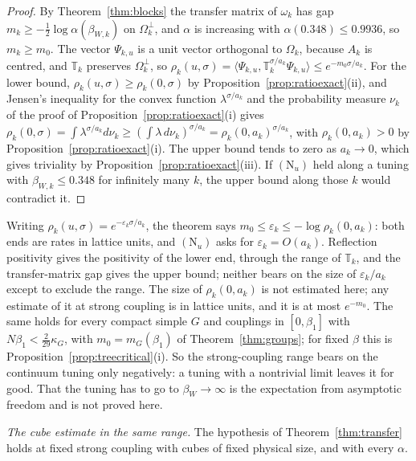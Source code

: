 \documentclass[aps,prd,twocolumn,superscriptaddress,nofootinbib,longbibliography,floatfix,amsmath,amssymb,10pt]{revtex4-2}
\theoremstyle{definition}
\theoremstyle{remark}
\newcommand{\ip}[2]{\langle #1,#2\rangle}
\begin{document}
\begin{proof}
By Theorem~\ref{thm:blocks} the transfer matrix of $\omega_k$ has gap
$m_k\ge-\frac12\log\alpha(\beta_{W,k})$ on $\Omega_k^\perp$, and $\alpha$ is
increasing with $\alpha(0.348)\le0.9936$, so $m_k\ge m_0$. The vector
$\Psi_{k,u}$ is a unit vector orthogonal to $\Omega_k$, because $A_k$ is
centred, and $\mathbb T_k$ preserves $\Omega_k^\perp$, so
$\rho_k(u,\sigma)=\ip{\Psi_{k,u}}{\mathbb T_k^{\sigma/a_k}\Psi_{k,u}}\le
e^{-m_0\sigma/a_k}$. For the lower bound, $\rho_k(u,\sigma)\ge\rho_k(0,\sigma)$
by Proposition~\ref{prop:ratioexact}(ii), and Jensen's inequality for the
convex function $\lambda^{\sigma/a_k}$ and the probability measure $\nu_k$ of
the proof of Proposition~\ref{prop:ratioexact}(i) gives
$\rho_k(0,\sigma)=\int\lambda^{\sigma/a_k}d\nu_k\ge(\int\lambda\,d\nu_k)^{
\sigma/a_k}=\rho_k(0,a_k)^{\sigma/a_k}$, with $\rho_k(0,a_k)>0$ by
Proposition~\ref{prop:ratioexact}(i). The upper bound tends to zero as
$a_k\to0$, which gives triviality by Proposition~\ref{prop:ratioexact}(iii).
If $(\mathrm N_u)$ held along a tuning with $\beta_{W,k}\le0.348$ for
infinitely many $k$, the upper bound along those $k$ would contradict it.
\end{proof}

Writing $\rho_k(u,\sigma)=e^{-\varepsilon_k\sigma/a_k}$, the theorem says
$m_0\le\varepsilon_k\le-\log\rho_k(0,a_k)$: both ends are rates in lattice
units, and $(\mathrm N_u)$ asks for $\varepsilon_k=O(a_k)$. Reflection
positivity gives the positivity of the lower end, through the range of
$\mathbb T_k$, and the transfer-matrix gap gives the upper bound; neither
bears on the size of $\varepsilon_k/a_k$ except to exclude the range. The size
of $\rho_k(0,a_k)$ is not estimated here; any estimate of it at strong
coupling is in lattice units, and it is at most $e^{-m_0}$. The same holds for
every compact simple $G$ and couplings in $[0,\beta_1]$ with
$N\beta_1<\frac2{29}\kappa_G$, with $m_0=m_G(\beta_1)$ of
Theorem~\ref{thm:groups}; for fixed $\beta$ this is
Proposition~\ref{prop:treecritical}(i). So the strong-coupling range bears on
the continuum tuning only negatively: a tuning with a nontrivial limit leaves
it for good. That the tuning has to go to $\beta_W\to\infty$ is the
expectation from asymptotic freedom and is not proved here.

\emph{The cube estimate in the same range.} The hypothesis of
Theorem~\ref{thm:transfer} holds at fixed strong coupling with cubes of fixed
physical size, and with every $\alpha$.
\end{document}

